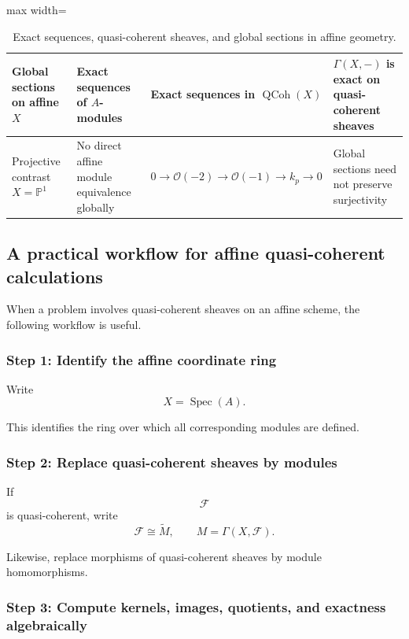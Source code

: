 \documentclass[12pt,a4paper]{article}
\theoremstyle{notespace}
\begin{document}
\begin{table}[htbp]
\begin{adjustbox}{max width=\textwidth}
\begin{tabular}{
				|>{\raggedright\arraybackslash}p{4.2cm}
				|>{\raggedright\arraybackslash}p{5.2cm}
				|>{\raggedright\arraybackslash}p{5.2cm}
				|>{\raggedright\arraybackslash}p{5.3cm}|
			}
			Global sections on affine \(X\)
			&
			Exact sequences of \(A\)-modules
			&
			Exact sequences in \(\operatorname{QCoh}(X)\)
			&
			\(\displaystyle \Gamma(X,-)\)
			is exact on quasi-coherent sheaves
			\\
			\hline
			
			Projective contrast
			\(\displaystyle X=\mathbb{P}^{1}\)
			&
			No direct affine module equivalence globally
			&
			\(\displaystyle
			0\to\mathcal{O}(-2)
			\to\mathcal{O}(-1)
			\to k_{p}
			\to0
			\)
			&
			Global sections need not preserve surjectivity
			\\
			\hline
		\end{tabular}
	\end{adjustbox}
	\caption{Exact sequences, quasi-coherent sheaves, and global sections in affine geometry.}
	\label{tab:exact-qcoh-affine-global-sections}
\end{table}

\subsection{A practical workflow for affine quasi-coherent calculations}

When a problem involves quasi-coherent sheaves on an affine scheme, the
following workflow is useful.

\subsubsection{Step 1: Identify the affine coordinate ring}

Write
\[
X=\operatorname{Spec}(A).
\]

This identifies the ring over which all corresponding modules are defined.

\subsubsection{Step 2: Replace quasi-coherent sheaves by modules}

If
\[
\mathcal{F}
\]
is quasi-coherent, write
\[
\mathcal{F}\cong\widetilde{M},
\qquad
M=\Gamma(X,\mathcal{F}).
\]

Likewise, replace morphisms of quasi-coherent sheaves by module
homomorphisms.

\subsubsection{Step 3: Compute kernels, images, quotients, and exactness algebraically}
\end{document}
